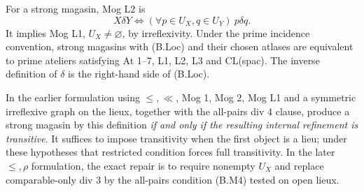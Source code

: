 \begin{theorem}
\label{SA21-B-local-equivalence}
For a strong magasin, Mog L2 is
\[
 X\delta Y\Longleftrightarrow
       (\forall p\in U_X,q\in U_Y)\ p\delta q.        \tag{B.Loc}
\]
It implies Mog L1, \(U_X\ne\varnothing\), by irreflexivity. Under the
prime incidence convention, strong magasins with (B.Loc) and their
chosen atlases are equivalent to prime ateliers satisfying
At 1--7, L1, L2, L3 and CL(spac). The inverse definition of
\(\delta\) is the right-hand side of (B.Loc).

In the earlier formulation using \(\leq,\ll\), Mog 1, Mog 2,
Mog L1 and a symmetric irreflexive graph on the lieux, together with
the all-pairs div 4 clause, produce a strong magasin by this definition
\emph{if and only if the resulting internal refinement is transitive}.
It suffices to impose transitivity when the first object is a lieu;
under these hypotheses that restricted condition forces full transitivity.
In the later \(\leq,\rho\) formulation, the exact repair is to require
nonempty \(U_X\) and replace comparable-only div 3 by the all-pairs
condition (B.M4) tested on open lieux.
\end{theorem}

